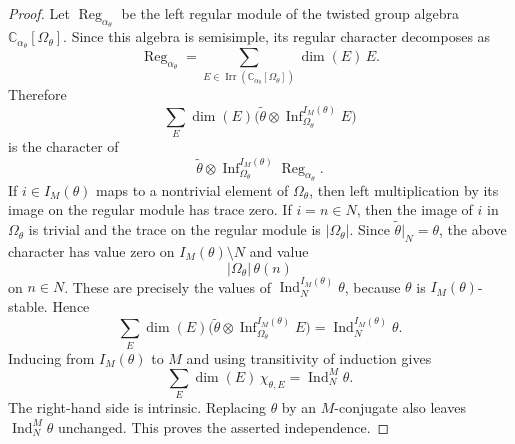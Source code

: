 \documentclass{amsart}
\theoremstyle{plain}
\numberwithin{equation}{section}
\theoremstyle{definition}
\renewcommand{\dim}{\operatorname{dim}}
\newcommand{\Ind}{\operatorname{Ind}}
\newcommand{\Irr}{\operatorname{Irr}}
\newcommand{\infl}{\operatorname{Inf}}
\DeclareMathOperator{\Reg}{Reg}
\newcommand{\C}{\mathbb{C}}
\begin{document}
\begin{proof}
Let \(\Reg_{\alpha_\theta}\) be the left regular module of the twisted group
algebra \(\C_{\alpha_\theta}[\Omega_\theta]\).  Since this algebra is semisimple,
its regular character decomposes as
\[
        \Reg_{\alpha_\theta}
        =
        \sum_{E\in\Irr(\C_{\alpha_\theta}[\Omega_\theta])}
        \dim(E)\,E .
\]
Therefore
\[
        \sum_E \dim(E)
        \bigl(\widetilde\theta\otimes
        \infl_{\Omega_\theta}^{I_M(\theta)}E\bigr)
\]
is the character of
\[
        \widetilde\theta\otimes
        \infl_{\Omega_\theta}^{I_M(\theta)}\Reg_{\alpha_\theta}.
\]
If \(i\in I_M(\theta)\) maps to a nontrivial element of \(\Omega_\theta\), then
left multiplication by its image on the regular module has trace zero.  If
\(i=n\in N\), then the image of \(i\) in \(\Omega_\theta\) is trivial and the
trace on the regular module is \(|\Omega_\theta|\).  Since
\(\widetilde\theta|_N=\theta\), the above character has value zero on
\(I_M(\theta)\setminus N\) and value
\[
        |\Omega_\theta|\,\theta(n)
\]
on \(n\in N\).  These are precisely the values of
\(\Ind_N^{I_M(\theta)}\theta\), because \(\theta\) is
\(I_M(\theta)\)-stable.  Hence
\[
        \sum_E \dim(E)
        \bigl(\widetilde\theta\otimes
        \infl_{\Omega_\theta}^{I_M(\theta)}E\bigr)
        =
        \Ind_N^{I_M(\theta)}\theta .
\]
Inducing from \(I_M(\theta)\) to \(M\) and using transitivity of induction gives
\[
        \sum_E \dim(E)\,\chi_{\theta,E}
        =
        \Ind_N^M\theta .
\]
The right-hand side is intrinsic.  Replacing \(\theta\) by an \(M\)-conjugate
also leaves \(\Ind_N^M\theta\) unchanged.  This proves the asserted
independence.
\end{proof}
\end{document}

